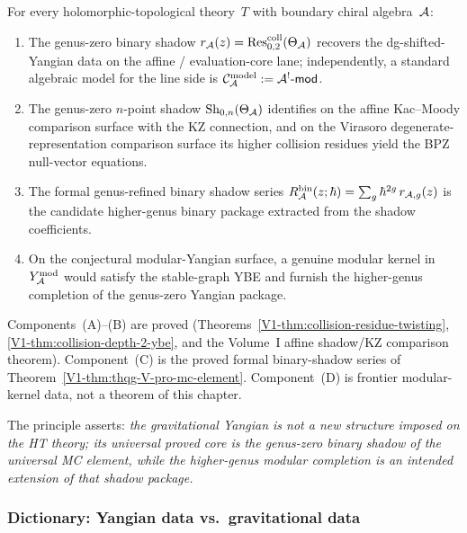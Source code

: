 \begin{principle}
For every holomorphic-topological theory~$T$ with boundary chiral
algebra~$\mathcal{A}$:
\begin{enumerate}[label=\textup{(\Alph*)}]
\item The genus-zero binary shadow
 $r_{\mathcal{A}}(z) = \operatorname{Res}^{\mathrm{coll}}_{0,2}(\Theta_{\mathcal{A}})$ recovers the
 dg-shifted-Yangian data on the affine / evaluation-core lane;
 independently, a standard algebraic model for the line side is
 $\mathcal{C}_{\mathcal{A}}^{\mathrm{model}} := \mathcal{A}^!\text{-}\mathsf{mod}$.
\item The genus-zero $n$-point shadow
 $\operatorname{Sh}_{0,n}(\Theta_{\mathcal{A}})$ identifies on the affine Kac--Moody
 comparison surface with the KZ connection, and on the Virasoro
 degenerate-representation comparison surface its higher collision
 residues yield the BPZ null-vector equations.
\item The formal genus-refined binary shadow series
 $R^{\mathrm{bin}}_{\mathcal{A}}(z;\hbar) =
 \sum_g \hbar^{2g}\,r_{\mathcal{A},g}(z)$ is the candidate higher-genus
 binary package extracted from the shadow coefficients.
\item On the conjectural modular-Yangian surface, a genuine modular
 kernel in $Y^{\mathrm{mod}}_{\mathcal{A}}$ would satisfy the stable-graph YBE and furnish
 the higher-genus completion of the genus-zero Yangian package.
\end{enumerate}
Components~(A)--(B) are proved
\textup{(}Theorems~\textup{\ref{V1-thm:collision-residue-twisting}},
\textup{\ref{V1-thm:collision-depth-2-ybe}},
and the Volume~I affine shadow/KZ comparison theorem\textup{)}.
Component~(C) is the proved formal binary-shadow series of
Theorem~\textup{\ref*{V1-thm:thqg-V-pro-mc-element}}.
Component~(D) is frontier modular-kernel data, not a theorem of this
chapter.

The principle asserts: \emph{the gravitational Yangian is not a new
structure imposed on the HT theory; its universal proved core is the
genus-zero binary shadow of the universal MC element, while the
higher-genus modular completion is an intended extension of that
shadow package.}
\end{principle}


\subsubsection{Dictionary: Yangian data vs.\ gravitational data}

